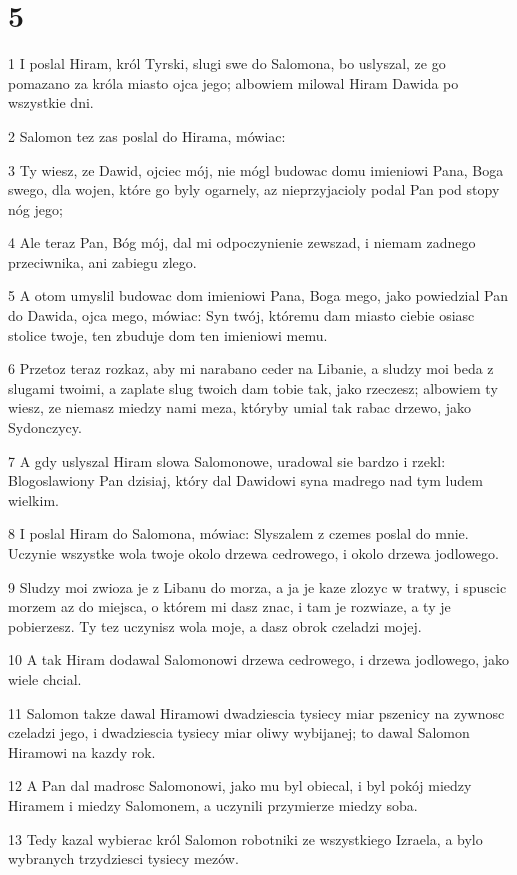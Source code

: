 \chapter{5}

\par 1 I poslal Hiram, król Tyrski, slugi swe do Salomona, bo uslyszal, ze go pomazano za króla miasto ojca jego; albowiem milowal Hiram Dawida po wszystkie dni.
\par 2 Salomon tez zas poslal do Hirama, mówiac:
\par 3 Ty wiesz, ze Dawid, ojciec mój, nie mógl budowac domu imieniowi Pana, Boga swego, dla wojen, które go byly ogarnely, az nieprzyjacioly podal Pan pod stopy nóg jego;
\par 4 Ale teraz Pan, Bóg mój, dal mi odpoczynienie zewszad, i niemam zadnego przeciwnika, ani zabiegu zlego.
\par 5 A otom umyslil budowac dom imieniowi Pana, Boga mego, jako powiedzial Pan do Dawida, ojca mego, mówiac: Syn twój, któremu dam miasto ciebie osiasc stolice twoje, ten zbuduje dom ten imieniowi memu.
\par 6 Przetoz teraz rozkaz, aby mi narabano ceder na Libanie, a sludzy moi beda z slugami twoimi, a zaplate slug twoich dam tobie tak, jako rzeczesz; albowiem ty wiesz, ze niemasz miedzy nami meza, któryby umial tak rabac drzewo, jako Sydonczycy.
\par 7 A gdy uslyszal Hiram slowa Salomonowe, uradowal sie bardzo i rzekl: Blogoslawiony Pan dzisiaj, który dal Dawidowi syna madrego nad tym ludem wielkim.
\par 8 I poslal Hiram do Salomona, mówiac: Slyszalem z czemes poslal do mnie. Uczynie wszystke wola twoje okolo drzewa cedrowego, i okolo drzewa jodlowego.
\par 9 Sludzy moi zwioza je z Libanu do morza, a ja je kaze zlozyc w tratwy, i spuscic morzem az do miejsca, o którem mi dasz znac, i tam je rozwiaze, a ty je pobierzesz. Ty tez uczynisz wola moje, a dasz obrok czeladzi mojej.
\par 10 A tak Hiram dodawal Salomonowi drzewa cedrowego, i drzewa jodlowego, jako wiele chcial.
\par 11 Salomon takze dawal Hiramowi dwadziescia tysiecy miar pszenicy na zywnosc czeladzi jego, i dwadziescia tysiecy miar oliwy wybijanej; to dawal Salomon Hiramowi na kazdy rok.
\par 12 A Pan dal madrosc Salomonowi, jako mu byl obiecal, i byl pokój miedzy Hiramem i miedzy Salomonem, a uczynili przymierze miedzy soba.
\par 13 Tedy kazal wybierac król Salomon robotniki ze wszystkiego Izraela, a bylo wybranych trzydziesci tysiecy mezów.
